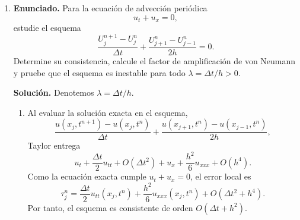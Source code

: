 \documentclass[11pt]{article}
\newcommand{\abs}[1]{\left|#1\right|}
\def\mat   #1{\mbox{\boldmath $\mathsf #1$}}
\def\vec   #1{\mbox{\boldmath $#1$}{}}
\begin{document}
\begin{enumerate}[label=\textbf{\arabic*.}, leftmargin=*]
\begin{enumerate}[label=(\alph*)]
        \item La solución discreta se obtiene resolviendo
        \[
            \mat A_h\vec U_h=\vec F_h,
        \]
        donde $\vec U_h$ contiene los valores interiores $u_{ij}$. Para esta solución manufacturada, la tabla siguiente muestra
        \[
            E_h=\max_{i,j}\abs{u(x_i,y_j)-u_{ij}},
            \qquad
            \operatorname{ECR}(h)=
            \frac{\log(E_h/E_{2h})}{\log(h/(2h))}.
        \]
        \begin{center}
        \begin{tabular}{c c c c}
            \toprule
            $N$ & $h$ & $E_h$ & $\operatorname{ECR}$\\
            \midrule
            $8$  & $1/8$  & $1.2951\cdot10^{-2}$ & -\\
            $16$ & $1/16$ & $3.2190\cdot10^{-3}$ & $2.0084$\\
            $32$ & $1/32$ & $8.0358\cdot10^{-4}$ & $2.0021$\\
            $64$ & $1/64$ & $2.0082\cdot10^{-4}$ & $2.0005$\\
            \bottomrule
        \end{tabular}
        \end{center}
        Esto confirma el orden cuadrático. En este caso particular, el modo $\sin(\pi x)\sin(\pi y)$ es también un modo propio del laplaciano discreto, con autovalor
        \[
            \lambda_h=\frac{8}{h^2}\sin^2\!\left(\frac{\pi h}{2}\right),
        \]
        mientras que el autovalor continuo es $2\pi^2$. Esta identidad explica por qué el comportamiento asintótico se ve tan limpio.
    \end{enumerate}

    \item \textbf{Enunciado.} Para la ecuación de advección periódica
    \[
        u_t+u_x=0,
    \]
    estudie el esquema
    \[
        \frac{U_j^{n+1}-U_j^n}{\Delta t}
        +
        \frac{U_{j+1}^n-U_{j-1}^n}{2h}=0.
    \]
    Determine su consistencia, calcule el factor de amplificación de von Neumann y pruebe que el esquema es inestable para todo $\lambda=\Delta t/h>0$.

    \textbf{Solución.} Denotemos $\lambda=\Delta t/h$.
    \begin{enumerate}[label=(\alph*)]
        \item Al evaluar la solución exacta en el esquema,
        \[
            \frac{u(x_j,t^{n+1})-u(x_j,t^n)}{\Delta t}
            +
            \frac{u(x_{j+1},t^n)-u(x_{j-1},t^n)}{2h},
        \]
        Taylor entrega
        \[
            u_t+\frac{\Delta t}{2}u_{tt}+O(\Delta t^2)
            +
            u_x+\frac{h^2}{6}u_{xxx}+O(h^4).
        \]
        Como la ecuación exacta cumple $u_t+u_x=0$, el error local es
        \[
            \tau_j^n
            =
            \frac{\Delta t}{2}u_{tt}(x_j,t^n)
            +
            \frac{h^2}{6}u_{xxx}(x_j,t^n)
            +O(\Delta t^2+h^4).
        \]
        Por tanto, el esquema es consistente de orden $O(\Delta t+h^2)$.


\end{enumerate}
\end{enumerate}
\end{document}
